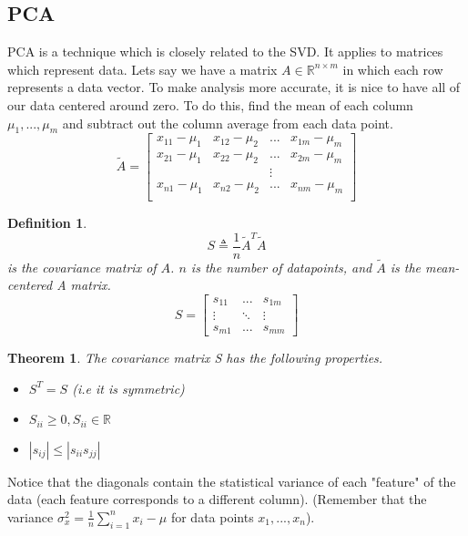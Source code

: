 \documentclass{article}
\newtheorem{theorem}{Theorem}
\newtheorem{definition}{Definition}
\begin{document}
\subsection{PCA}
PCA is a technique which is closely related to the SVD. It applies to matrices which represent data.
Lets say we have a matrix $A \in \mathbb{R}^{n \times m}$ in which each row represents a data vector.
To make analysis more accurate, it is nice to have all of our data centered around zero.
To do this, find the mean of each column $\mu_1, ..., \mu_m$ and subtract out the column average from each data point.
\[
    \tilde{A} = \left[
        \begin{array}{cccc}
            x_{11} - \mu_1 & x_{12} - \mu_2 & ... &x_{1m} - \mu_m\\
            x_{21} - \mu_1 & x_{22} - \mu_2 & ... &x_{2m} - \mu_m\\
             & & \vdots & \\
             x_{n1} - \mu_1 & x_{n2} - \mu_2 & ... &x_{nm} - \mu_m\\
        \end{array}
    \right]
\]
\begin{definition}
    $$ S \triangleq \frac{1}{n}\tilde{A}^T\tilde{A}$$
    is the covariance matrix of $A$. $n$ is the number of datapoints,
    and $\tilde{A}$ is the mean-centered A matrix.
    \[
        S = \left[
            \begin{array}{ccc}
                s_{11} & ... & s_{1m}\\
                \vdots & \ddots & \vdots\\
                s_{m1} & ... & s_{mm}
            \end{array}
        \right]
    \]
\end{definition}
\begin{theorem}
    The covariance matrix S has the following properties.
    \begin{itemize}
        \item $S^T = S$ (i.e it is symmetric)
        \item $S_{ii} \ge 0, S_{ii} \in \mathbb{R}$
        \item $|s_{ij}| \le |s_{ii}s_{jj}|$
    \end{itemize}
\end{theorem}
Notice that the diagonals contain the statistical variance of each "feature" of the data (each feature corresponds to a different column).
(Remember that the variance $\sigma_x^2 = \frac{1}{n}\sum_{i=1}^{n}{x_i-\mu}$ for data points $x_1, ..., x_n$).
\end{document}

